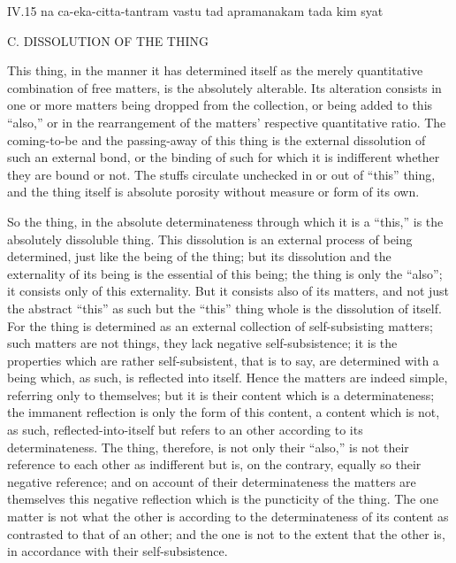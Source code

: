 IV.15
na ca-eka-citta-tantram vastu tad apramanakam tada kim syat

C. DISSOLUTION OF THE THING

This thing, in the manner it has determined itself
as the merely quantitative combination of free matters,
is the absolutely alterable.
Its alteration consists in one or more matters
being dropped from the collection,
or being added to this “also,”
or in the rearrangement of the matters'
respective quantitative ratio.
The coming-to-be and the passing-away of this thing is
the external dissolution of such an external bond,
or the binding of such for which it is indifferent
whether they are bound or not.
The stuffs circulate unchecked in or out of “this” thing,
and the thing itself is absolute porosity
without measure or form of its own.

So the thing, in the absolute determinateness
through which it is a “this,”
is the absolutely dissoluble thing.
This dissolution is an external process of being determined,
just like the being of the thing;
but its dissolution and the externality of its being
is the essential of this being;
the thing is only the “also”;
it consists only of this externality.
But it consists also of its matters,
and not just the abstract “this” as such
but the “this” thing whole is the dissolution of itself.
For the thing is determined as an external collection
of self-subsisting matters;
such matters are not things,
they lack negative self-subsistence;
it is the properties which are rather self-subsistent,
that is to say, are determined with a being
which, as such, is reflected into itself.
Hence the matters are indeed simple, referring only to themselves;
but it is their content which is a determinateness;
the immanent reflection is only the form of this content,
a content which is not, as such, reflected-into-itself
but refers to an other according to its determinateness.
The thing, therefore, is not only their “also,”
is not their reference to each other as indifferent
but is, on the contrary, equally so their negative reference;
and on account of their determinateness
the matters are themselves this negative reflection
which is the puncticity of the thing.
The one matter is not what the other is
according to the determinateness of its content
as contrasted to that of an other;
and the one is not to the extent that the other is,
in accordance with their self-subsistence.

